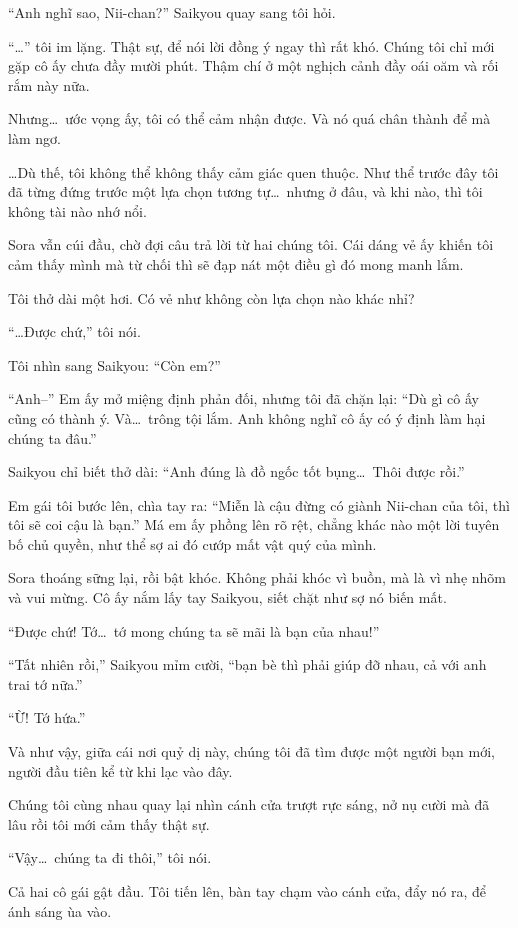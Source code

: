 \documentclass[../main.tex]{subfiles}
\begin{document}
``Anh nghĩ sao, Nii-chan?'' Saikyou quay sang tôi hỏi.

``\dots'' tôi im lặng. Thật sự, để nói lời đồng ý ngay thì rất khó. Chúng tôi chỉ mới gặp cô ấy chưa đầy mười phút. Thậm chí ở một nghịch cảnh đầy oái oăm và rối rắm này nữa.

Nhưng\dots\ ước vọng ấy, tôi có thể cảm nhận được. Và nó quá chân thành để mà làm ngơ.

\dots Dù thế, tôi không thể không thấy cảm giác quen thuộc. Như thể trước đây tôi đã từng đứng trước một lựa chọn tương tự\dots\ nhưng ở đâu, và khi nào, thì tôi không tài nào nhớ nổi.

Sora vẫn cúi đầu, chờ đợi câu trả lời từ hai chúng tôi. Cái dáng vẻ ấy khiến tôi cảm thấy mình mà từ chối thì sẽ đạp nát một điều gì đó mong manh lắm.

Tôi thở dài một hơi. Có vẻ như không còn lựa chọn nào khác nhỉ?

``\dots Được chứ,'' tôi nói.

Tôi nhìn sang Saikyou: ``Còn em?''

``Anh--'' Em ấy mở miệng định phản đối, nhưng tôi đã chặn lại: ``Dù gì cô ấy cũng có thành ý. Và\dots\ trông tội lắm. Anh không nghĩ cô ấy có ý định làm hại chúng ta đâu.''

Saikyou chỉ biết thở dài: ``Anh đúng là đồ ngốc tốt bụng\dots\ Thôi được rồi.''

Em gái tôi bước lên, chìa tay ra: ``Miễn là cậu đừng có giành Nii-chan của tôi, thì tôi sẽ coi cậu là bạn.'' Má em ấy phồng lên rõ rệt, chẳng khác nào một lời tuyên bố chủ quyền, như thể sợ ai đó cướp mất vật quý của mình.

Sora thoáng sững lại, rồi bật khóc. Không phải khóc vì buồn, mà là vì nhẹ nhõm và vui mừng. Cô ấy nắm lấy tay Saikyou, siết chặt như sợ nó biến mất.

``Được chứ! Tớ\dots\ tớ mong chúng ta sẽ mãi là bạn của nhau!''

``Tất nhiên rồi,'' Saikyou mỉm cười, ``bạn bè thì phải giúp đỡ nhau, cả với anh trai tớ nữa.''

``Ừ! Tớ hứa.''

Và như vậy, giữa cái nơi quỷ dị này, chúng tôi đã tìm được một người bạn mới,  người đầu tiên kể từ khi lạc vào đây.

Chúng tôi cùng nhau quay lại nhìn cánh cửa trượt rực sáng, nở nụ cười mà đã lâu rồi tôi mới cảm thấy thật sự.

``Vậy\dots\ chúng ta đi thôi,'' tôi nói.

Cả hai cô gái gật đầu. Tôi tiến lên, bàn tay chạm vào cánh cửa, đẩy nó ra, để ánh sáng ùa vào.
\end{document}
